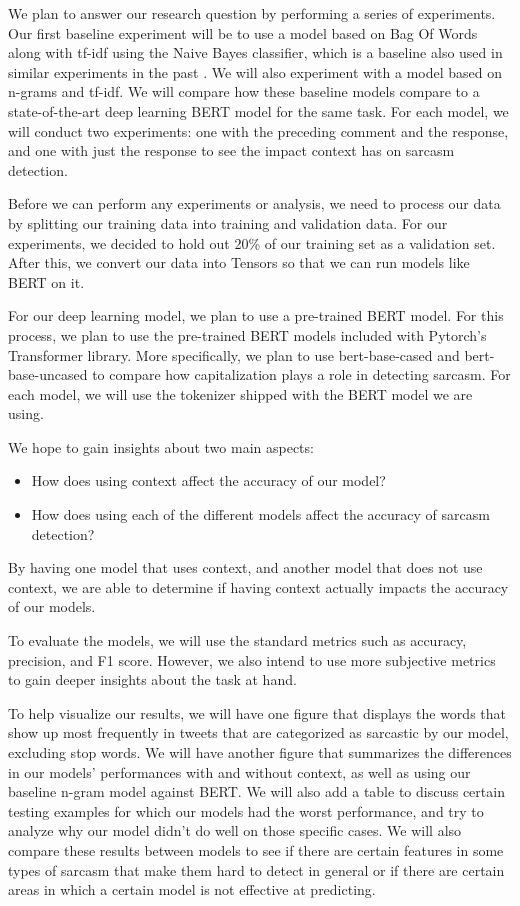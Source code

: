 \documentclass[11pt,a4paper]{article}
\begin{document}
We plan to answer our research question by performing a series of experiments. Our first baseline experiment will be to use a model based on Bag Of Words along with tf-idf \cite{Salton:86} using the Naive Bayes classifier, which is a baseline also used in similar experiments in the past \cite{hazarika}. We will also experiment with a model based on n-grams and tf-idf. We will compare how these baseline models compare to a state-of-the-art deep learning BERT model \cite{devlin2019bert} for the same task. For each model, we will conduct two experiments: one with the preceding comment and the response, and one with just the response to see the impact context has on sarcasm detection.

Before we can perform any experiments or analysis, we need to process our data by splitting our training data into training and validation data. For our experiments, we decided to hold out 20\% of our training set as a validation set. After this, we convert our data into Tensors so that we can run models like BERT on it.

For our deep learning model, we plan to use a pre-trained BERT model. For this process, we plan to use the pre-trained BERT models included with Pytorch's Transformer library. More specifically, we plan to use bert-base-cased and bert-base-uncased to compare how capitalization plays a role in detecting sarcasm. For each model, we will use the tokenizer shipped with the BERT model we are using. 


We hope to gain insights about two main aspects: 
\begin{itemize}
  \item How does using context affect the accuracy of our model?
  \item How does using each of the different models affect the accuracy of sarcasm detection?
\end{itemize}
By having one model that uses context, and another model that does not use context, we are able to determine if having context actually impacts the accuracy of our models.

To evaluate the models, we will use the standard metrics such as accuracy, precision, and F1 score. However, we also intend to use more subjective metrics to gain deeper insights about the task at hand.

To help visualize our results, we will have one figure that displays the words that show up most frequently in tweets that are categorized as sarcastic by our model, excluding stop words.
We will have another figure that summarizes the differences in our models' performances with and without context, as well as using our baseline n-gram model against BERT.
We will also add a table to discuss certain testing examples for which our models had the worst performance, and try to analyze why our model didn't do well on those specific cases. We will also compare these results between models to see if there are certain features in some types of sarcasm that make them hard to detect in general or if there are certain areas in which a certain model is not effective at predicting.




\end{document}
